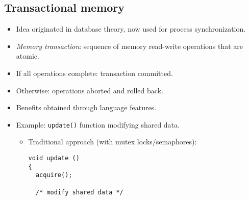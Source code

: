 \subsection{Transactional memory}
\begin{itemize}
    \item Idea originated in database theory, now used for process synchronization.
    \item \textit{Memory transaction}: sequence of memory read-write operations that are atomic.
    \item If all operations complete: transaction committed.
    \item Otherwise: operations aborted and rolled back.
    \item Benefits obtained through language features.
    \item Example: \texttt{update()} function modifying shared data.
    \begin{itemize}
        \item Traditional approach (with mutex locks/semaphores):
        \begin{verbatim}
void update ()
{
  acquire();
 
  /* modify shared data */
 

\end{verbatim}
\end{itemize}
\end{itemize}
